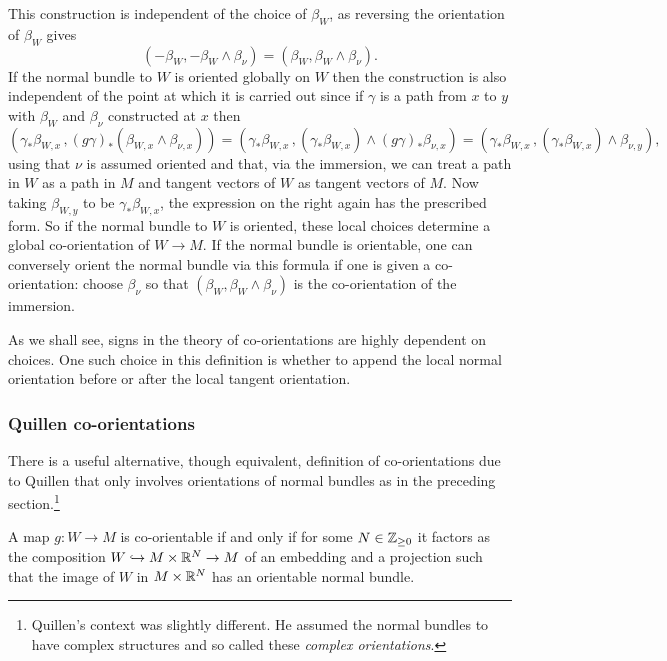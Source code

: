 This construction is independent of the choice of $\beta_W$, as reversing the orientation of $\beta_W$ gives
$$(-\beta_W, -\beta_W \wedge \beta_\nu) = (\beta_W, \beta_W \wedge \beta_\nu).$$
If the normal bundle to $W$ is oriented globally on $W$ then the construction is also independent of the point at which it is carried out since if $\gamma$ is a path from $x$ to $y$ with $\beta_W$ and $\beta_\nu$ constructed at $x$ then
\begin{equation*}
	(\gamma_*\beta_{W,x}\, , (g\gamma)_* (\beta_{W,x} \wedge \beta_{\nu,x})) =
	(\gamma_*\beta_{W,x}\, , (\gamma_* \beta_{W,x}) \wedge (g\gamma)_*\beta_{\nu,x}) =
	(\gamma_*\beta_{W,x}\, , (\gamma_* \beta_{W,x}) \wedge \beta_{\nu,y}),
\end{equation*}
using that $\nu$ is assumed oriented and that, via the immersion, we can treat a path in $W$ as a path in $M$ and tangent vectors of $W$ as tangent vectors of $M$.
Now taking $\beta_{W,y}$ to be $\gamma_* \beta_{W,x}$, the expression on the right again has the prescribed form. 
So if the normal bundle to $W$ is oriented, these local choices determine a global co-orientation of $W \to M$.
If the normal bundle is orientable, one can conversely orient the normal bundle via this formula if one is given a co-orientation: choose $\beta_\nu$ so that $(\beta_W, \beta_W \wedge \beta_\nu)$ is the co-orientation of the immersion.

As we shall see, signs in the theory of co-orientations are highly dependent on choices.
One such choice in this definition is whether to append the local normal orientation before or after the local tangent orientation.

\subsubsection{Quillen co-orientations}\label{S: Quillen}

There is a useful alternative, though equivalent, definition of co-orientations due to Quillen \cite{Quil71} that only involves orientations of normal bundles as in the preceding section.\footnote{Quillen's context was slightly different.
He assumed the normal bundles to have complex structures and so called these \textit{complex orientations}.}

\begin{lemma}\label{L: Quillen}
	A map $g \colon W \to M$ is co-orientable if and only if for some $N \in \mathbb{Z}_{\geq 0}$ it factors as the composition $W \hookrightarrow M \times \mathbb{R}^N \to M$ of an embedding and a projection such that the image of $W$ in $M \times \mathbb{R}^N$ has an orientable normal bundle.
\end{lemma}

